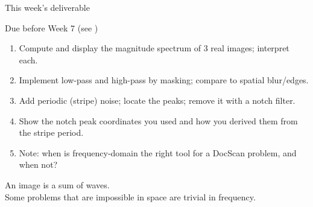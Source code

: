 \documentclass[10pt,aspectratio=169]{beamer}
\begin{document}
\begin{frame}{This week's deliverable}
  \begin{alertblock}{Due before Week 7 (see )}
    \begin{enumerate}
      \item Compute and display the magnitude spectrum of 3 real images; interpret each.
      \item Implement low-pass and high-pass by masking; compare to spatial blur/edges.
      \item Add periodic (stripe) noise; locate the peaks; remove it with a notch filter.
      \item Show the notch peak coordinates you used and how you derived them from the stripe period.
      \item Note: when is frequency-domain the right tool for a DocScan problem, and when not?
    \end{enumerate}
  \end{alertblock}
\end{frame}

\begin{frame}[standout]
  An image is a sum of waves.\\[4pt]
  \normalsize Some problems that are impossible in space are trivial in frequency.
\end{frame}
\end{document}
